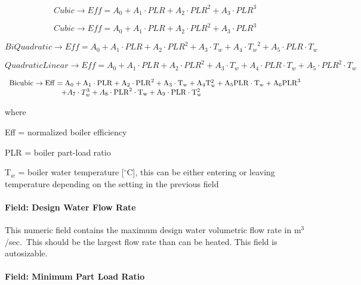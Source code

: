 \begin{equation}
    Cubic \to Eff = {A_0} + {A_1}\cdot PLR + {A_2}\cdot PL{R^2} + {A_3}\cdot PL{R^3}
\end{equation}

\begin{equation}
    Cubic \to Eff = {A_0} + {A_1}\cdot PLR + {A_2}\cdot PL{R^2} + {A_3}\cdot PL{R^3}
\end{equation}

\begin{equation}
    BiQuadratic \to Eff = {A_0} + {A_1}\cdot PLR + {A_2}\cdot PL{R^2} + {A_3}\cdot {T_w} + {A_4}\cdot {T_w}^2 + {A_5}\cdot PLR\cdot {T_w}
\end{equation}

\begin{equation}
    QuadraticLinear \to Eff = {A_0} + {A_1}\cdot PLR + {A_2}\cdot PL{R^2} + {A_3}\cdot {T_w} + {A_4}\cdot PLR\cdot {T_w} + {A_5}\cdot PL{R^2}\cdot {T_w}
\end{equation}

\begin{equation}
    \begin{array}{l}
        \rm{Bicubic} \to \rm{Eff} = A_0 + A_1 \cdot \rm{PLR} + A_2 \cdot \rm{PLR}^2 + A_3 \cdot T_w + A_4 T_w^2 + A_5 \rm{PLR} \cdot T_w + A_6 \rm{PLR}^3 \\
        \quad \quad \quad \quad \quad \quad \quad  + A_7 \cdot T_w^3 + A_8 \cdot \rm{PLR}^2 \cdot T_w + A_9 \cdot \rm{PLR} \cdot T_w^2
    \end{array}
\end{equation}

where

Eff = normalized boiler efficiency

PLR = boiler part-load ratio

T\(_{w}\) = boiler water temperature {[}$^\circ$C{]}, this can be either entering or leaving temperature depending on the setting in the previous field

\paragraph{Field: Design Water Flow Rate}\label{field-design-water-flow-rate-001}

This numeric field contains the maximum design water volumetric flow rate in m\(^{3}\)/sec.~This should be the largest flow rate than can be heated. This field is autosizable.

\paragraph{Field: Minimum Part Load Ratio}\label{field-minimum-part-load-ratio-9}

